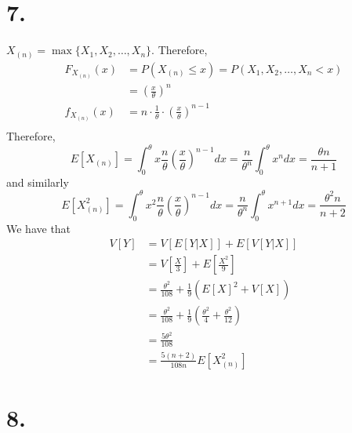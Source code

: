 \documentclass[11pt]{article}
\begin{document}
\section*{7.}
$X_{(n)} = \max\{X_1, X_2, \ldots, X_n\}$. Therefore,
\begin{equation*}
    \begin{aligned}
        F_{X_{(n)}}(x) &= P(X_{(n)} \le x) = P(X_1, X_2, \ldots, X_n < x) \\
        &= \left(\frac{x}{\theta}\right)^n \\
        f_{X_{(n)}}(x) &= n \cdot \frac{1}{\theta} \cdot \left(\frac{x}{\theta}\right)^{n-1}\\
    \end{aligned}
\end{equation*}
Therefore,
\[
    E[X_{(n)}] = \int_0^{\theta} x \frac{n}{\theta}  \left(\frac{x}{\theta} \right)^{n-1} dx
    = \frac{n}{\theta^n} \int_0^\theta x^n dx = \frac{\theta n }{n+1}
\]
and similarly
\[
    E[X_{(n)}^2] = \int_0^{\theta} x^2 \frac{n}{\theta}  \left(\frac{x}{\theta} \right)^{n-1} dx
    = \frac{n}{\theta^n} \int_0^\theta x^{n+1} dx = \frac{\theta^2 n }{n+2}
\]
We have that
\begin{equation*}
    \begin{aligned}
        V[Y] &= V[E[Y|X]] + E[V[Y|X]] \\
        &= V\left[\frac{X}{3} \right] + E\left[\frac{X^2}{9} \right] \\
        &= \frac{\theta^2}{108}  + \frac{1}{9} (E[X]^2 + V[X]) \\
        &= \frac{\theta^2}{108}  + \frac{1}{9} \left(\frac{\theta^2}{4} + \frac{\theta^2}{12} \right) \\
        &= \frac{5\theta^{2}}{108} \\
        &= \frac{5(n+2)}{108n}E[X_{(n)}^2]
    \end{aligned}
\end{equation*}
\pagebreak
\section*{8.}
\end{document}
